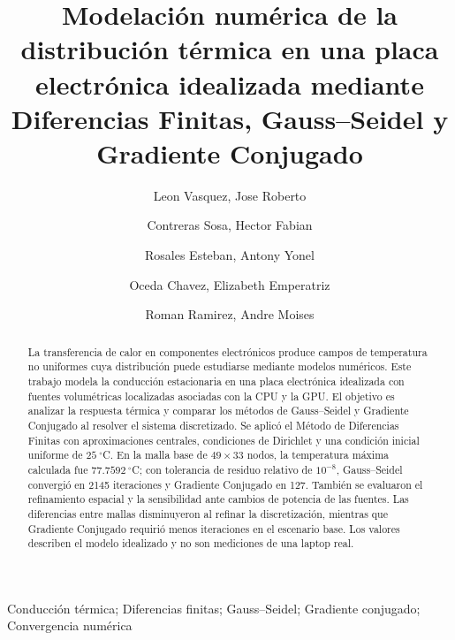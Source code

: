 
\begin{frontmatter}

\title{
Modelación numérica de la distribución térmica en una placa electrónica idealizada mediante Diferencias Finitas, Gauss--Seidel y Gradiente Conjugado
}

\author[utec]{Leon Vasquez, Jose Roberto}
\author[utec]{Contreras Sosa, Hector Fabian}
\author[utec]{Rosales Esteban, Antony Yonel}
\author[utec]{Oceda Chavez, Elizabeth Emperatriz}
\author[utec]{Roman Ramirez, Andre Moises}



\begin{abstract}
La transferencia de calor en componentes electr\'onicos produce campos de temperatura no uniformes cuya distribuci\'on puede estudiarse mediante modelos num\'ericos. Este trabajo modela la conducci\'on estacionaria en una placa electr\'onica idealizada con fuentes volum\'etricas localizadas asociadas con la CPU y la GPU. El objetivo es analizar la respuesta t\'ermica y comparar los m\'etodos de Gauss--Seidel y Gradiente Conjugado al resolver el sistema discretizado. Se aplic\'o el M\'etodo de Diferencias Finitas con aproximaciones centrales, condiciones de Dirichlet y una condici\'on inicial uniforme de $25\ ^\circ$C. En la malla base de $49\times33$ nodos, la temperatura m\'axima calculada fue $77.7592\ ^\circ$C; con tolerancia de residuo relativo de $10^{-8}$, Gauss--Seidel convergi\'o en 2145 iteraciones y Gradiente Conjugado en 127. Tambi\'en se evaluaron el refinamiento espacial y la sensibilidad ante cambios de potencia de las fuentes. Las diferencias entre mallas disminuyeron al refinar la discretizaci\'on, mientras que Gradiente Conjugado requiri\'o menos iteraciones en el escenario base. Los valores describen el modelo idealizado y no son mediciones de una laptop real.
\end{abstract}

\begin{keyword}
Conducci\'on t\'ermica; Diferencias finitas; Gauss--Seidel; Gradiente conjugado; Convergencia num\'erica
\end{keyword}

\end{frontmatter}

